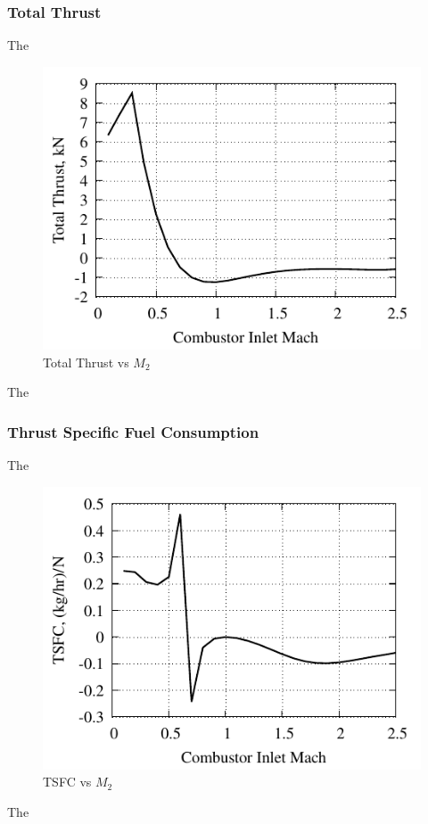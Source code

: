 \documentclass[conf]{new-aiaa} %
\begin{document}
\subsubsection{Total Thrust}
The

\begin{figure}[hbt!]
\centering
\includegraphics[]{media/performance_parameter_files/part_h_T.pdf}
\caption{\label{fig:partht} Total Thrust vs \texorpdfstring{\textit{$M_2$}}{M2}}
\end{figure}
The

\subsubsection{Thrust Specific Fuel Consumption}
The

\begin{figure}[hbt!]
\centering
\includegraphics[]{media/performance_parameter_files/part_h_TSFC.pdf}
\caption{\label{fig:parthtsfc} TSFC vs \texorpdfstring{\textit{$M_2$}}{M2}}
\end{figure}
The
\end{document}
